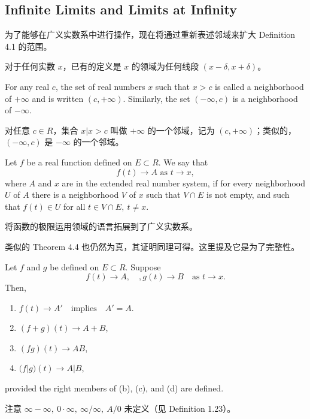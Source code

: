 \documentclass[../poma-notes.tex]{subfiles}
\begin{document}
\subsection*{Infinite Limits and Limits at Infinity}

为了能够在广义实数系中进行操作，现在将通过重新表述邻域来扩大 Definition 4.1 的范围。

对于任何实数 $x$，已有的定义是 $x$ 的领域为任何线段 $(x - \delta, x + \delta)$。

\begin{definition}
  For any real $c$, the set of real numbers $x$ such that $x > c$ is called a neighborhood of $+\infty$ and is
  written $(c, +\infty)$. Similarly, the set $(-\infty,c)$ is a neighborhood of $-\infty$.
\end{definition}

\begin{anote}
  对任意 $c \in R$，集合 $x | x > c$ 叫做 $+\infty$ 的一个邻域，记为 $(c, +\infty)$；类似的，$(-\infty,c)$ 是 $-\infty$
  的一个邻域。
\end{anote}

\begin{definition}
  Let $f$ be a real function defined on $E \subset R$. We say that
  \[
    f(t) \to A \text{ as } t \to x,
  \]
  where $A$ and $x$ are in the extended real number system, if for every neighborhood $U$ of $A$ there is a
  neighborhood $V$ of $x$ such that $V \cap E$ is not empty, and such that $f(t) \in U$ for all $t\in V\cap E,\
    t \ne x$.
\end{definition}

\begin{anote}
  将函数的极限运用领域的语言拓展到了广义实数系。
\end{anote}

类似的 Theorem 4.4 也仍然为真，其证明同理可得。这里提及它是为了完整性。

\begin{theorem}
  Let $f$ and $g$ be defined on $E \subset R$. Suppose
  \[
    f(t) \to A, \quad, g(t) \to B \quad \text{as } t \to x.
  \]
  Then,
  \begin{enumerate}[label=(\alph*)]
    \item $f(t) \to A' \quad \text{implies} \quad A' = A$.
    \item $(f + g)(t) \to A + B$,
    \item $(fg)(t) \to AB$,
    \item $(f|g)(t) \to A|B$,
  \end{enumerate}
  provided the right members of (b), (c), and (d) are defined.
\end{theorem}

注意 $\infty - \infty,\ 0 \cdot \infty,\ \infty/\infty,\ A/0$ 未定义（见 Definition 1.23）。
\end{document}
